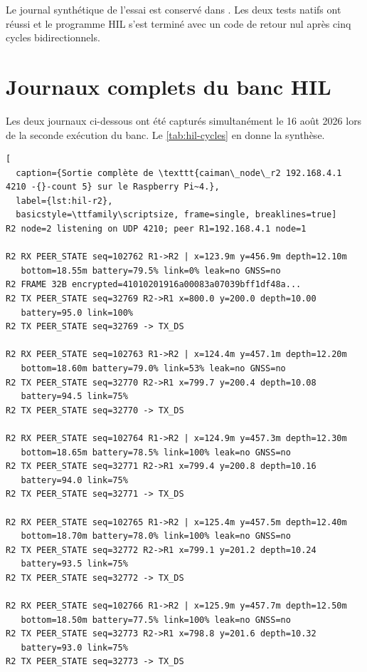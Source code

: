Le journal synthétique de l'essai est conservé dans
. Les deux tests natifs ont
réussi et le programme HIL s'est terminé avec un code de retour nul après cinq
cycles bidirectionnels.

\section{Journaux complets du banc HIL}

Les deux journaux ci-dessous ont été capturés simultanément le 16 août 2026 lors de la seconde exécution du banc. Le \cref{tab:hil-cycles} en donne la synthèse.

\begin{lstlisting}[
  caption={Sortie complète de \texttt{caiman\_node\_r2 192.168.4.1 4210 -{}-count 5} sur le Raspberry Pi~4.},
  label={lst:hil-r2},
  basicstyle=\ttfamily\scriptsize, frame=single, breaklines=true]
R2 node=2 listening on UDP 4210; peer R1=192.168.4.1 node=1

R2 RX PEER_STATE seq=102762 R1->R2 | x=123.9m y=456.9m depth=12.10m
   bottom=18.55m battery=79.5% link=0% leak=no GNSS=no
R2 FRAME 32B encrypted=41010201916a00083a07039bff1df48a...
R2 TX PEER_STATE seq=32769 R2->R1 x=800.0 y=200.0 depth=10.00
   battery=95.0 link=100%
R2 TX PEER_STATE seq=32769 -> TX_DS

R2 RX PEER_STATE seq=102763 R1->R2 | x=124.4m y=457.1m depth=12.20m
   bottom=18.60m battery=79.0% link=53% leak=no GNSS=no
R2 TX PEER_STATE seq=32770 R2->R1 x=799.7 y=200.4 depth=10.08
   battery=94.5 link=75%
R2 TX PEER_STATE seq=32770 -> TX_DS

R2 RX PEER_STATE seq=102764 R1->R2 | x=124.9m y=457.3m depth=12.30m
   bottom=18.65m battery=78.5% link=100% leak=no GNSS=no
R2 TX PEER_STATE seq=32771 R2->R1 x=799.4 y=200.8 depth=10.16
   battery=94.0 link=75%
R2 TX PEER_STATE seq=32771 -> TX_DS

R2 RX PEER_STATE seq=102765 R1->R2 | x=125.4m y=457.5m depth=12.40m
   bottom=18.70m battery=78.0% link=100% leak=no GNSS=no
R2 TX PEER_STATE seq=32772 R2->R1 x=799.1 y=201.2 depth=10.24
   battery=93.5 link=75%
R2 TX PEER_STATE seq=32772 -> TX_DS

R2 RX PEER_STATE seq=102766 R1->R2 | x=125.9m y=457.7m depth=12.50m
   bottom=18.50m battery=77.5% link=100% leak=no GNSS=no
R2 TX PEER_STATE seq=32773 R2->R1 x=798.8 y=201.6 depth=10.32
   battery=93.0 link=75%
R2 TX PEER_STATE seq=32773 -> TX_DS
\end{lstlisting}

